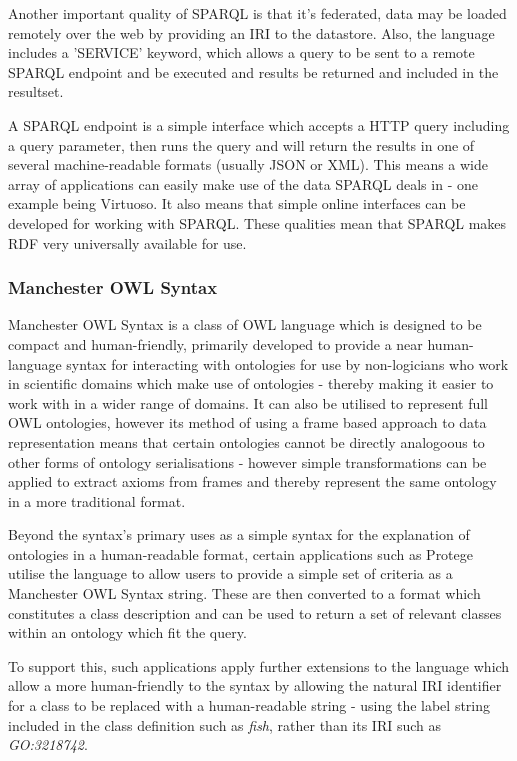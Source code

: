 \documentclass{article}
\begin{document}
Another important quality of SPARQL is that it's federated, data may be loaded
remotely over the web by providing an IRI to the datastore. Also, the language
includes a 'SERVICE' keyword, which allows a query to be sent to a remote SPARQL
endpoint and be executed and results be returned and included in the resultset.

A SPARQL endpoint is a simple interface which accepts a HTTP query including a
query parameter, then runs the query and will return the results in one of 
several machine-readable formats (usually JSON or XML). This means a wide array
of applications can easily make use of the data SPARQL deals in - one example
being Virtuoso. It also means that simple online interfaces can be developed for 
working with SPARQL. These qualities mean that SPARQL makes RDF very universally
available for use.

\subsubsection{Manchester OWL Syntax}

Manchester OWL Syntax is a class of OWL language which is designed to be compact
and human-friendly, primarily developed to provide a near human-language syntax
for interacting with ontologies for use by non-logicians who work in scientific
domains which make use of ontologies - thereby making it easier to work with in
a wider range of domains. It can also be utilised to represent full OWL
ontologies, however its method of using a frame based approach to data
representation means that certain ontologies cannot be directly analogoous to
other forms of ontology serialisations - however simple transformations can be
applied to extract axioms from frames and thereby represent the same ontology in
a more traditional format. 

Beyond the syntax's primary uses as a simple syntax for the explanation of
ontologies in a human-readable format, certain applications such as Protege
utilise the language to allow users to provide a simple set of criteria as a 
Manchester OWL Syntax string. These are then converted to a format which
constitutes a class description and can be used to return a set of relevant
classes within an ontology which fit the query. 

To support this, such applications apply further extensions to the language
which allow a more human-friendly to the syntax by allowing the natural IRI
identifier for a class to be replaced with a human-readable string - using the
label string included in the class definition such as \emph{fish}, rather than
its IRI such as \emph{GO:3218742}.
\end{document}
